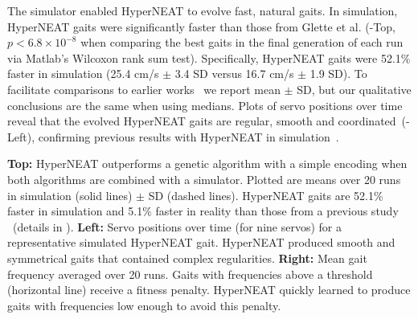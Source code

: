 

The simulator enabled HyperNEAT to evolve fast, natural gaits. In
simulation, HyperNEAT gaits were
significantly faster than those from Glette et al. (-Top, $p <
6.8\times10^{-8}$ when comparing the best gaits in the final
generation of each run via Matlab's Wilcoxon rank sum test).
Specifically, HyperNEAT gaits were 52.1\% faster in simulation (25.4
cm/s $\pm$ 3.4 SD versus 16.7 cm/s $\pm$ 1.9 SD). To facilitate comparisons to earlier works~\cite{yos:clune,glette} we report 
mean $\pm$ SD, but our qualitative conclusions are the same when using medians.
Plots of servo positions over time reveal that the evolved HyperNEAT gaits are regular, smooth and coordinated~(-Left), confirming previous results with HyperNEAT in simulation~\cite{clune2011performance,clune2009evolving}.

{
\textbf{Top: }
HyperNEAT outperforms a genetic algorithm with a simple encoding \cite{glette} when both algorithms are combined with a simulator. Plotted are means over 20 runs in simulation (solid lines) $\pm$ SD (dashed lines). HyperNEAT gaits are 52.1\% faster in
simulation and 5.1\% faster in reality than those from a previous study \cite{glette}~(details in ).
\textbf{Left: }
Servo positions over time (for nine servos) for a representative simulated HyperNEAT gait. HyperNEAT produced smooth and symmetrical gaits that contained complex regularities. 
\textbf{Right: }Mean gait frequency averaged over 20 runs. 
Gaits with frequencies above a threshold (horizontal line) receive a fitness penalty. HyperNEAT quickly learned to produce gaits with frequencies low enough to avoid this penalty.
}


